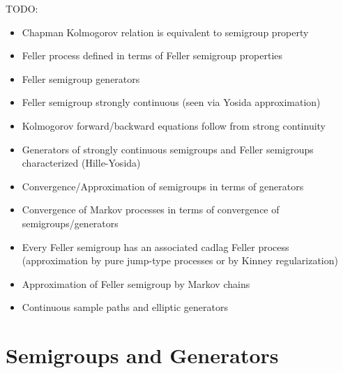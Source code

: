 TODO:
\begin{itemize}
\item Chapman Kolmogorov relation is equivalent to semigroup property
\item Feller process defined in terms of Feller semigroup properties
\item Feller semigroup generators
\item Feller semigroup strongly continuous (seen via Yosida approximation)
\item Kolmogorov forward/backward equations follow from strong continuity
\item Generators of strongly continuous semigroups and Feller semigroups characterized (Hille-Yosida)
\item Convergence/Approximation of semigroups in terms of generators
\item Convergence of Markov processes in terms of convergence of semigroups/generators
\item Every Feller semigroup has an associated cadlag Feller process (approximation by pure jump-type processes or by Kinney regularization)
\item Approximation of Feller semigroup by Markov chains
\item Continuous sample paths and elliptic generators
\end{itemize}

\section{Semigroups and Generators}

